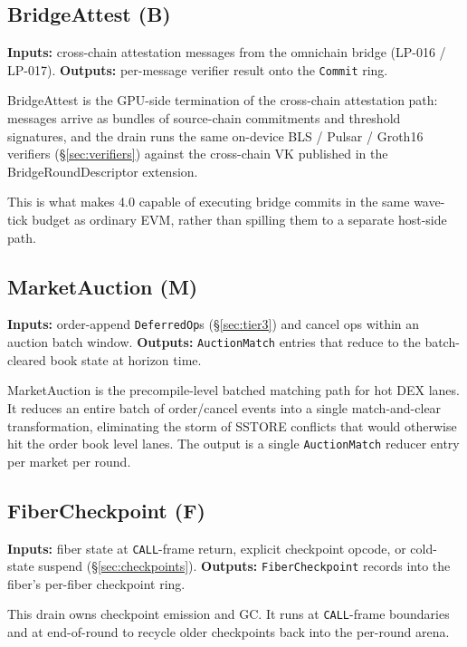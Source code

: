 \subsection{BridgeAttest (B)}

\textbf{Inputs:} cross-chain attestation messages from the omnichain
bridge (LP-016 / LP-017). \textbf{Outputs:} per-message verifier
result onto the \texttt{Commit} ring.

BridgeAttest is the GPU-side termination of the cross-chain attestation
path: messages arrive as bundles of source-chain commitments and
threshold signatures, and the drain runs the same on-device BLS /
Pulsar / Groth16 verifiers (\S\ref{sec:verifiers}) against the
cross-chain VK published in the BridgeRoundDescriptor extension.

This is what makes 4.0 capable of executing bridge commits in the same
wave-tick budget as ordinary EVM, rather than spilling them to a
separate host-side path.

\subsection{MarketAuction (M)}

\textbf{Inputs:} order-append \texttt{DeferredOp}s
(\S\ref{sec:tier3}) and cancel ops within an auction batch window.
\textbf{Outputs:} \texttt{AuctionMatch} entries that reduce to the
batch-cleared book state at horizon time.

MarketAuction is the precompile-level batched matching path for hot
DEX lanes. It reduces an entire batch of order/cancel events into a
single match-and-clear transformation, eliminating the storm of
SSTORE conflicts that would otherwise hit the order book level lanes.
The output is a single \texttt{AuctionMatch} reducer entry per market
per round.

\subsection{FiberCheckpoint (F)}

\textbf{Inputs:} fiber state at \texttt{CALL}-frame return,
explicit checkpoint opcode, or cold-state suspend
(\S\ref{sec:checkpoints}). \textbf{Outputs:}
\texttt{FiberCheckpoint} records into the fiber's per-fiber checkpoint
ring.

This drain owns checkpoint emission and GC. It runs at
\texttt{CALL}-frame boundaries and at end-of-round to recycle older
checkpoints back into the per-round arena.

